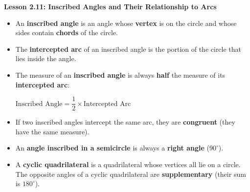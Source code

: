 \begin{center}
\textbf{Lesson 2.11: Inscribed Angles and Their Relationship to Arcs}
\end{center}

\vspace*{-1.5ex}


\begin{itemize}
    \item An \textbf{inscribed angle} is an angle whose \textbf{vertex} is on the circle and whose sides contain \textbf{chords} of the circle.
    \item The \textbf{intercepted arc} of an inscribed angle is the portion of the circle that lies inside the angle.
    \item The measure of an \textbf{inscribed angle} is always \textbf{half} the measure of its \textbf{intercepted arc}:

{\centering $
    \text{Inscribed Angle} = \dfrac{1}{2} \times \text{Intercepted Arc}
$\par}
    \item If two inscribed angles intercept the same arc, they are \textbf{congruent} (they have the same measure).
    \item An \textbf{angle inscribed in a semicircle} is always a \textbf{right angle} ($90^\circ$).
    \item A \textbf{cyclic quadrilateral} is a quadrilateral whose vertices all lie on a circle. The opposite angles of a cyclic quadrilateral are \textbf{supplementary} (their sum is $180^\circ$).
\end{itemize}

